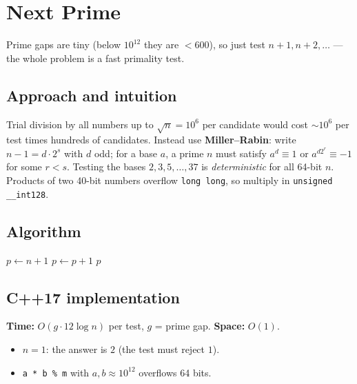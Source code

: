 \section{Next Prime}
\label{sec:n-next-prime}


\begin{patternbox}
Prime gaps are tiny (below $10^{12}$ they are $<600$), so just test
$n+1,n+2,\dots$ --- the whole problem is a fast primality test.
\end{patternbox}

\subsection*{Approach and intuition}

Trial division by all numbers up to $\sqrt n=10^6$ per candidate would cost
$\sim10^6$ per test times hundreds of candidates. Instead use
\textbf{Miller--Rabin}: write $n-1=d\cdot2^s$ with $d$ odd; for a base $a$,
a prime $n$ must satisfy $a^d\equiv1$ or $a^{d2^r}\equiv-1$ for some $r<s$.
Testing the bases $2,3,5,\dots,37$ is \emph{deterministic} for all 64-bit
$n$. Products of two 40-bit numbers overflow \texttt{long long}, so multiply in
\texttt{unsigned \_\_int128}.

\subsection*{Algorithm}
\begin{algorithmic}[1]
\State $p\gets n+1$
 $p\gets p+1$ \EndWhile
\State \Return $p$
\end{algorithmic}


\subsection*{C++17 implementation}

\begin{complexitybox}
\textbf{Time:} $O(g\cdot12\log n)$ per test, $g$ = prime gap.
\textbf{Space:} $O(1)$.
\end{complexitybox}

\begin{pitfallbox}
\begin{itemize}
  \item $n=1$: the answer is $2$ (the test must reject $1$).
  \item \texttt{a * b \% m} with $a,b\approx10^{12}$ overflows 64 bits.
\end{itemize}
\end{pitfallbox}
